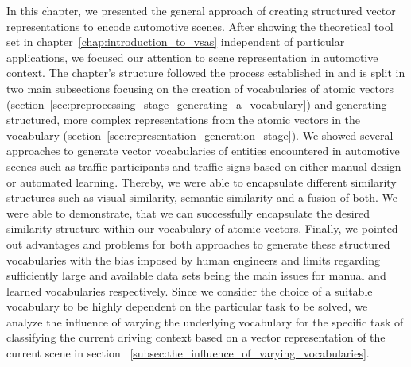 In this chapter, we presented the general approach of creating structured vector representations to encode automotive scenes.
After showing the theoretical tool set in chapter~\ref{chap:introduction_to_vsas} independent of particular applications, we focused our attention to scene representation in automotive context.
The chapter's structure followed the process established in \cite{Gallant2013} and is split in two main subsections focusing on the creation of vocabularies of atomic vectors (section~\ref{sec:preprocessing_stage_generating_a_vocabulary}) and generating structured, more complex representations from the atomic vectors in the vocabulary (section~\ref{sec:representation_generation_stage}).
We showed several approaches to generate vector vocabularies of entities encountered in automotive scenes such as traffic participants and traffic signs based on either manual design or automated learning.
Thereby, we were able to encapsulate different similarity structures such as visual similarity, semantic similarity and a fusion of both.
We were able to demonstrate, that we can successfully encapsulate the desired similarity structure within our vocabulary of atomic vectors.
Finally, we pointed out advantages and problems for both approaches to generate these structured vocabularies with the bias imposed by human engineers and limits regarding sufficiently large and available data sets being the main issues for manual and learned vocabularies respectively.
Since we consider the choice of a suitable vocabulary to be highly dependent on the particular task to be solved, we analyze the influence of varying the underlying vocabulary for the specific task of classifying the current driving context based on a vector representation of the current scene in section ~\ref{subsec:the_influence_of_varying_vocabularies}.

